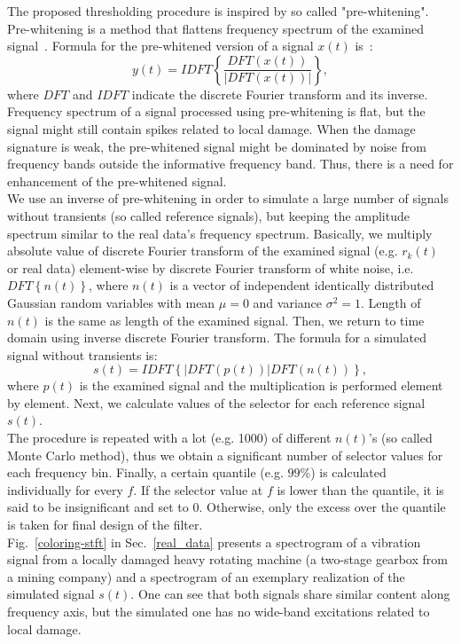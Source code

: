 \documentclass[11pt]{article} %
\begin{document}
The proposed thresholding procedure is inspired by so called "pre-whitening". Pre-whitening is a method that flattens frequency spectrum of the examined signal~\cite{bib10,bib11,bib12}. Formula for the pre-whitened version of a signal $x(t)$ is~\cite{Borghesani2013}:
\begin{equation}
y(t)=IDFT\left\{\frac{DFT\left(x(t)\right)}{\left|DFT\left(x(t)\right)\right|}\right\},
\end{equation}
where $DFT$ and $IDFT$  indicate the discrete Fourier transform and its inverse. Frequency spectrum of a signal processed using pre-whitening is flat, but the signal might still contain spikes related to local damage. When the damage signature is weak, the pre-whitened signal might be dominated by noise from frequency bands outside the informative frequency band. Thus, there is a need for enhancement of the pre-whitened signal.\\
We use an inverse of pre-whitening in order to simulate a large number of signals without transients (so called reference signals), but keeping the amplitude spectrum similar to the real data's frequency spectrum. Basically, we multiply absolute value of discrete Fourier transform of the examined signal (e.g. $r_k(t)$ or real data) element-wise by discrete Fourier transform of white noise, i.e. $DFT\left\{n(t)\right\}$, where $n(t)$ is a vector of independent identically distributed Gaussian random variables with mean $\mu=0$ and variance $\sigma^2=1$. Length of $n(t)$ is the same as length of the examined signal. Then, we return to time domain using inverse discrete Fourier transform. The formula for a simulated signal without transients is:
\begin{equation}
s(t)=IDFT\left\{{\left|DFT\left(p(t)\right)\right|}{DFT\left(n(t)\right)}\right\},
\end{equation}
where $p(t)$ is the examined signal and the multiplication is performed element by element. Next, we calculate values of the selector for each reference signal $s(t)$.\\
The procedure is repeated with a lot (e.g. 1000) of different $n(t)$'s (so called Monte Carlo method), thus we obtain a significant number of selector values for each frequency bin. Finally, a certain quantile (e.g. $99\%$) is calculated individually for every $f$. If the selector value at $f$ is lower than the quantile, it is said to be insignificant and set to 0. Otherwise, only the excess over the quantile is taken for final design of the filter.\\
Fig.~\ref{coloring-stft} in Sec.~\ref{real_data} presents a spectrogram of a vibration signal from a locally damaged heavy rotating machine (a two-stage gearbox from a mining company) and a spectrogram of an exemplary realization of the simulated signal $s(t)$. One can see that both signals share similar content along frequency axis, but the simulated one has no wide-band excitations related to local damage.
\end{document}
